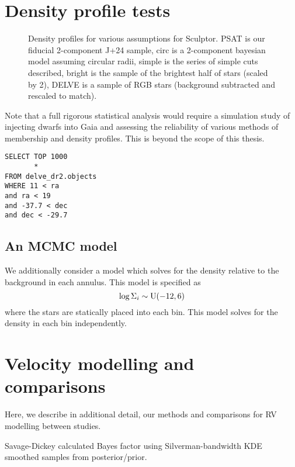 \section{Density profile tests}\label{density-profile-tests}

\begin{figure}
\centering
{}
\caption[Density profiles]{Density profiles for various assumptions for
Sculptor. PSAT is our fiducial 2-component J+24 sample, circ is a
2-component bayesian model assuming circular radii, simple is the series
of simple cuts described, bright is the sample of the brightest half of
stars (scaled by 2), DELVE is a sample of RGB stars (background
subtracted and rescaled to
match).}\label{fig:sculptor_observed_profiles}
\end{figure}

Note that a full rigorous statistical analysis would require a
simulation study of injecting dwarfs into Gaia and assessing the
reliability of various methods of membership and density profiles. This
is beyond the scope of this thesis.

\begin{verbatim}
SELECT TOP 1000
       *
FROM delve_dr2.objects
WHERE 11 < ra
and ra < 19
and -37.7 < dec
and dec < -29.7
\end{verbatim}

\subsection{An MCMC model}\label{an-mcmc-model}

We additionally consider a model which solves for the density relative
to the background in each annulus. This model is specified as \[
\log\Sigma_i \sim {\rm U}(-12, 6)
\] where the stars are statically placed into each bin. This model
solves for the density in each bin independently.

\section{Velocity modelling and
comparisons}\label{velocity-modelling-and-comparisons}

Here, we describe in additional detail, our methods and comparisons for
RV modelling between studies.

Savage-Dickey calculated Bayes factor using Silverman-bandwidth KDE
smoothed samples from posterior/prior.

